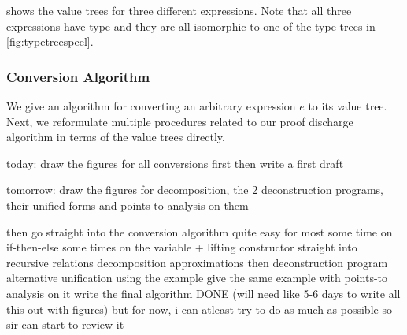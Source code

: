  shows the value trees for three different expressions.
Note that all three expressions have  type and they are all isomorphic
to one of the  type trees in \cref{fig:typetreespeel}.

\subsubsection{Conversion Algorithm}
We give an algorithm for converting an arbitrary expression $e$ to its value tree.
Next, we reformulate multiple procedures related to our proof discharge algorithm
in terms of the value trees directly.

today: draw the figures for all conversions first
then write a first draft

tomorrow: draw the figures for decomposition, the 2 deconstruction programs, their unified forms and
points-to analysis on them


then go straight into the conversion algorithm
quite easy for most
some time on if-then-else
some times on the variable + lifting constructor
straight into recursive relations
decomposition
approximations
then deconstruction program alternative
unification using the example
give the same example with points-to analysis on it
write the final algorithm
DONE
(will need like 5-6 days to write all this out with figures)
but for now, i can atleast try to do as much as possible so sir can start to review it
